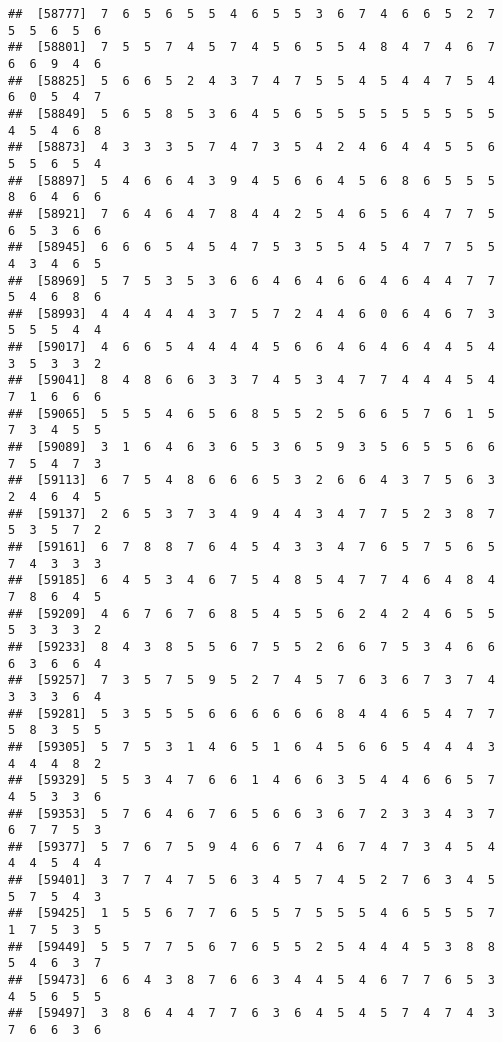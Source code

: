 \documentclass[
]{book}
\begin{document}
\begin{verbatim}
##  [58777]  7  6  5  6  5  5  4  6  5  5  3  6  7  4  6  6  5  2  7  5  5  6  5  6
##  [58801]  7  5  5  7  4  5  7  4  5  6  5  5  4  8  4  7  4  6  7  6  6  9  4  6
##  [58825]  5  6  6  5  2  4  3  7  4  7  5  5  4  5  4  4  7  5  4  6  0  5  4  7
##  [58849]  5  6  5  8  5  3  6  4  5  6  5  5  5  5  5  5  5  5  5  4  5  4  6  8
##  [58873]  4  3  3  3  5  7  4  7  3  5  4  2  4  6  4  4  5  5  6  5  5  6  5  4
##  [58897]  5  4  6  6  4  3  9  4  5  6  6  4  5  6  8  6  5  5  5  8  6  4  6  6
##  [58921]  7  6  4  6  4  7  8  4  4  2  5  4  6  5  6  4  7  7  5  6  5  3  6  6
##  [58945]  6  6  6  5  4  5  4  7  5  3  5  5  4  5  4  7  7  5  5  4  3  4  6  5
##  [58969]  5  7  5  3  5  3  6  6  4  6  4  6  6  4  6  4  4  7  7  5  4  6  8  6
##  [58993]  4  4  4  4  4  3  7  5  7  2  4  4  6  0  6  4  6  7  3  5  5  5  4  4
##  [59017]  4  6  6  5  4  4  4  4  5  6  6  4  6  4  6  4  4  5  4  3  5  3  3  2
##  [59041]  8  4  8  6  6  3  3  7  4  5  3  4  7  7  4  4  4  5  4  7  1  6  6  6
##  [59065]  5  5  5  4  6  5  6  8  5  5  2  5  6  6  5  7  6  1  5  7  3  4  5  5
##  [59089]  3  1  6  4  6  3  6  5  3  6  5  9  3  5  6  5  5  6  6  7  5  4  7  3
##  [59113]  6  7  5  4  8  6  6  6  5  3  2  6  6  4  3  7  5  6  3  2  4  6  4  5
##  [59137]  2  6  5  3  7  3  4  9  4  4  3  4  7  7  5  2  3  8  7  5  3  5  7  2
##  [59161]  6  7  8  8  7  6  4  5  4  3  3  4  7  6  5  7  5  6  5  7  4  3  3  3
##  [59185]  6  4  5  3  4  6  7  5  4  8  5  4  7  7  4  6  4  8  4  7  8  6  4  5
##  [59209]  4  6  7  6  7  6  8  5  4  5  5  6  2  4  2  4  6  5  5  5  3  3  3  2
##  [59233]  8  4  3  8  5  5  6  7  5  5  2  6  6  7  5  3  4  6  6  6  3  6  6  4
##  [59257]  7  3  5  7  5  9  5  2  7  4  5  7  6  3  6  7  3  7  4  3  3  3  6  4
##  [59281]  5  3  5  5  5  6  6  6  6  6  6  8  4  4  6  5  4  7  7  5  8  3  5  5
##  [59305]  5  7  5  3  1  4  6  5  1  6  4  5  6  6  5  4  4  4  3  4  4  4  8  2
##  [59329]  5  5  3  4  7  6  6  1  4  6  6  3  5  4  4  6  6  5  7  4  5  3  3  6
##  [59353]  5  7  6  4  6  7  6  5  6  6  3  6  7  2  3  3  4  3  7  6  7  7  5  3
##  [59377]  5  7  6  7  5  9  4  6  6  7  4  6  7  4  7  3  4  5  4  4  4  5  4  4
##  [59401]  3  7  7  4  7  5  6  3  4  5  7  4  5  2  7  6  3  4  5  5  7  5  4  3
##  [59425]  1  5  5  6  7  7  6  5  5  7  5  5  5  4  6  5  5  5  7  1  7  5  3  5
##  [59449]  5  5  7  7  5  6  7  6  5  5  2  5  4  4  4  5  3  8  8  5  4  6  3  7
##  [59473]  6  6  4  3  8  7  6  6  3  4  4  5  4  6  7  7  6  5  3  4  5  6  5  5
##  [59497]  3  8  6  4  4  7  7  6  3  6  4  5  4  5  7  4  7  4  3  7  6  6  3  6

\end{verbatim}
\end{document}
